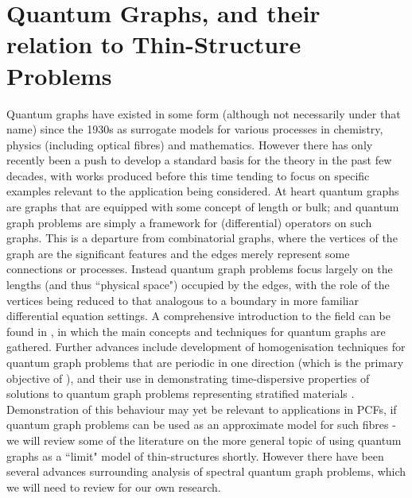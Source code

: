 \section{Quantum Graphs, and their relation to Thin-Structure Problems} \label{sec:GraphLitReview}
Quantum graphs have existed in some form (although not necessarily under that name) since the 1930s \cite{berkolaiko2013introduction} as surrogate models for various processes in chemistry, physics (including optical fibres) and mathematics.
However there has only recently been a push to develop a standard basis for the theory in the past few decades, with works produced before this time tending to focus on specific examples relevant to the application being considered.
At heart quantum graphs are graphs that are equipped with some concept of length or bulk; and quantum graph problems are simply a framework for (differential) operators on such graphs.
This is a departure from combinatorial graphs, where the vertices of the graph are the significant features and the edges merely represent some connections or processes.
Instead quantum graph problems focus largely on the lengths (and thus ``physical space") occupied by the edges, with the role of the vertices being reduced to that analogous to a boundary in more familiar differential equation settings.
A comprehensive introduction to the field can be found in \cite{berkolaiko2013introduction}, in which the main concepts and techniques for quantum graphs are gathered.
Further advances include development of homogenisation techniques for quantum graph problems that are periodic in one direction (which is the primary objective of \cite{cherednichenko2018unified}), and their use in demonstrating time-dispersive properties of solutions to quantum graph problems representing stratified materials \cite{cherednichenko2019time}.
Demonstration of this behaviour may yet be relevant to applications in PCFs, if quantum graph problems can be used as an approximate model for such fibres - we will review some of the literature on the more general topic of using quantum graphs as a ``limit" model of thin-structures shortly.
However there have been several advances surrounding analysis of spectral quantum graph problems, which we will need to review for our own research.  \newline

